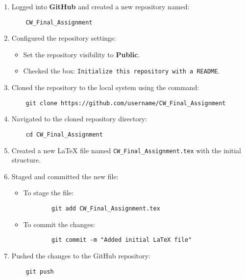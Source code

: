 \documentclass[12pt]{article}
\begin{document}
\begin{enumerate}
    \item Logged into \textbf{GitHub} and created a new repository named:
    \begin{verbatim}
    CW_Final_Assignment
    \end{verbatim}

    \item Configured the repository settings:
    \begin{itemize}
        \item Set the repository visibility to \textbf{Public}.
        \item Checked the box: \texttt{Initialize this repository with a README}.
    \end{itemize}

    \item Cloned the repository to the local system using the command:
    \begin{verbatim}
    git clone https://github.com/username/CW_Final_Assignment
    \end{verbatim}

    \item Navigated to the cloned repository directory:
    \begin{verbatim}
    cd CW_Final_Assignment
    \end{verbatim}

    \item Created a new LaTeX file named \texttt{CW\_Final\_Assignment.tex} with the initial structure.

    \item Staged and committed the new file:
    \begin{itemize}
        \item To stage the file:
        \begin{verbatim}
        git add CW_Final_Assignment.tex
        \end{verbatim}
        \item To commit the changes:
        \begin{verbatim}
        git commit -m "Added initial LaTeX file"
        \end{verbatim}
    \end{itemize}

    \item Pushed the changes to the GitHub repository:
    \begin{verbatim}
    git push
    \end{verbatim}
\end{enumerate}
\end{document}
